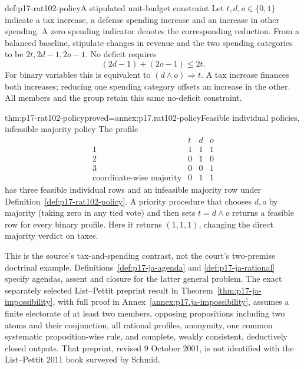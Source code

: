 \begin{hbdefinition}{def:p17-rat102-policy}{A stipulated unit-budget constraint}
Let \(t,d,o\in\{0,1\}\) indicate a tax increase, a defense spending
increase and an increase in other spending. A zero spending indicator
denotes the corresponding reduction. From a balanced baseline, stipulate
changes in revenue and the two spending categories to be
\(2t,2d-1,2o-1\). No deficit requires
\[
                   (2d-1)+(2o-1)\leq2t.
\]
For binary variables this is equivalent to \((d\land o)\Rightarrow t\).
A tax increase finances both increases; reducing one spending category
offsets an increase in the other. All members and the group retain this
same no-deficit constraint.
\end{hbdefinition}

\begin{hbtheorem}{thm:p17-rat102-policy}{proved=annex:p17.rat102-policy}{Feasible individual policies, infeasible majority policy}
The profile
\[
 \begin{array}{c|ccc}
      &t&d&o\\ \hline
 1&1&1&1\\
 2&0&1&0\\
 3&0&0&1\\ \hline
 \text{coordinate-wise majority}&0&1&1
 \end{array}
\]
has three feasible individual rows and an infeasible majority row under
Definition~\ref{def:p17-rat102-policy}.
A priority procedure that chooses \(d,o\) by majority (taking zero in
any tied vote) and then sets
\(t=d\land o\) returns a feasible row for every binary profile.
Here it returns \((1,1,1)\), changing the direct majority verdict on taxes.
\end{hbtheorem}

This is the source's tax-and-spending contrast, not the court's two-premise
doctrinal example. Definitions~\ref{def:p17-ja-agenda} and
\ref{def:p17-ja-rational} specify agendas, assent and closure for the latter
general problem. The exact separately selected List--Pettit preprint result
in Theorem~\ref{thm:p17-ja-impossibility}, with full proof in
Annex~\ref{annex:p17.ja-impossibility}, assumes a finite electorate of
at least two members,
opposing propositions including two atoms and their conjunction, all
rational profiles, anonymity, one common systematic proposition-wise rule,
and complete, weakly consistent, deductively closed outputs. That preprint,
revised 9 October 2001, is not identified with the List--Pettit 2011 book
surveyed by Schmid.

